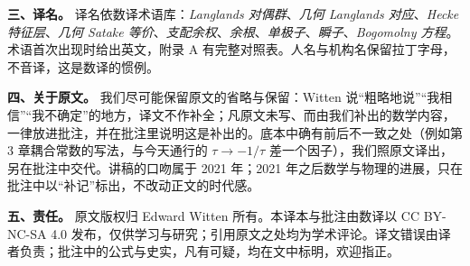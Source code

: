 \medskip
\noindent\textbf{三、译名。}\quad
译名依数译术语库：\emph{Langlands 对偶群}、\emph{几何 Langlands 对应}、\emph{Hecke 特征层}、\emph{几何 Satake 等价}、\emph{支配余权}、\emph{余根}、\emph{单极子}、\emph{瞬子}、\emph{Bogomolny 方程}。术语首次出现时给出英文，附录 A 有完整对照表。人名与机构名保留拉丁字母，不音译，这是数译的惯例。

\medskip
\noindent\textbf{四、关于原文。}\quad
我们尽可能保留原文的省略与保留：Witten 说“粗略地说”“我相信”“我不确定”的地方，译文不作补全；凡原文未写、而由我们补出的数学内容，一律放进批注，并在批注里说明这是补出的。底本中确有前后不一致之处（例如第 3 章耦合常数的写法，与今天通行的 $\tau \to -1/\tau$ 差一个因子），我们照原文译出，另在批注中交代。讲稿的口吻属于 2021 年；2021 年之后数学与物理的进展，只在批注中以“补记”标出，不改动正文的时代感。

\medskip
\noindent\textbf{五、责任。}\quad
原文版权归 Edward Witten 所有。本译本与批注由数译以 CC BY-NC-SA 4.0 发布，仅供学习与研究；引用原文之处均为学术评论。译文错误由译者负责；批注中的公式与史实，凡有可疑，均在文中标明，欢迎指正。
